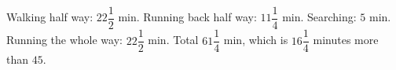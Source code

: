 Walking half way: $22\dfrac12$ min. Running back half way: $11\dfrac14$ min. Searching: $5$ min. Running the whole way: $22\dfrac12$ min. Total $61\dfrac14$ min, which is $\boxed{16\dfrac14}$ minutes more than $45$.
